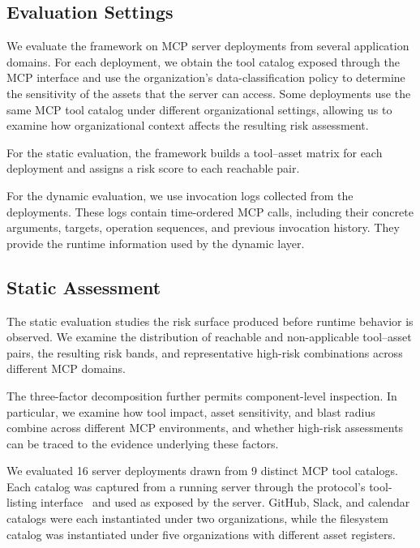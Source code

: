 \documentclass[sigconf]{acmart}
\begin{document}
\subsection{Evaluation Settings}
\label{sec:evaluation-setting}


We evaluate the framework on MCP server deployments from several application
domains. For each deployment, we obtain the tool catalog exposed through the
MCP interface and use the organization's data-classification policy to
determine the sensitivity of the assets that the server can access. Some
deployments use the same MCP tool catalog under different organizational
settings, allowing us to examine how organizational context affects the
resulting risk assessment.

For the static evaluation, the framework builds a tool--asset matrix for
each deployment and assigns a risk score to each reachable pair.

For the dynamic evaluation, we use invocation logs collected from the
deployments. These logs contain time-ordered MCP calls, including their
concrete arguments, targets, operation sequences, and previous invocation
history. They provide the runtime information used by the dynamic layer.





\subsection{Static Assessment}
\label{sec:static-eval}

The static evaluation studies the risk surface produced before runtime
behavior is observed. We examine the distribution of reachable and
non-applicable tool--asset pairs, the resulting risk bands, and
representative high-risk combinations across different MCP domains.

The three-factor decomposition further permits component-level inspection. In particular, we examine how tool impact, asset sensitivity, and blast radius combine across different MCP environments, and whether high-risk assessments can be traced to the evidence underlying these factors.

We evaluated 16 server deployments drawn from 9 distinct MCP tool catalogs.
Each catalog was captured from a running server through the protocol's
tool-listing interface~\cite{mcp2026spec} and used as exposed by the server.
GitHub, Slack, and calendar catalogs were each instantiated under two
organizations, while the filesystem catalog was instantiated under five
organizations with different asset registers.
\end{document}
